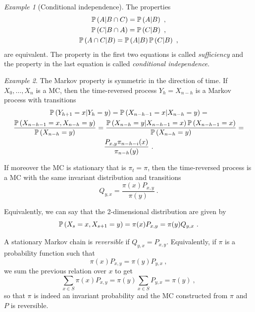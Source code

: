 \documentclass[12pt,a4paper]{amsart}
\theoremstyle{plain}%
\theoremstyle{definition}
\theoremstyle{remark}
\newtheorem{example}{Example}
\begin{document}
\begin{example}[Conditional independence]
The properties
\begin{gather*}
  \operatorname{\mathbb P}\left(A \middle| B \cap C\right) = \operatorname{\mathbb P}\left(A \middle| B\right) \ , \\
  \operatorname{\mathbb P}\left(C \middle| B \cap A\right) = \operatorname{\mathbb P}\left(C \middle| B\right) \ , \\
  \operatorname{\mathbb P}\left(A \cap C \middle| B\right) = \operatorname{\mathbb P}\left(A \middle| B\right) \operatorname{\mathbb P}\left(C \middle| B\right) \ ,
\end{gather*}
are equivalent. The property in the first two equations is called \emph{sufficiency} and the property in the last equation is called \emph{conditional independence}.
\end{example}
\begin{example}
The Markov property is symmetric in the direction of time. If $X_0,\dots,X_n$ is a MC, then the time-reversed process $Y_h = X_{n-h}$ is a Markov process with transitions
\begin{multline*}
  \operatorname{\mathbb P}\left(Y_{h+1}=x \middle| Y_{h}=y\right) = \operatorname{\mathbb P}\left(X_{n-h-1}=x \middle| X_{n-h}=y\right) = \\ \frac{\operatorname{\mathbb P}\left(X_{n-h-1}=x,X_{n-h}=y\right)}{\operatorname{\mathbb P}\left(X_{n-h}=y\right)} = \frac{\operatorname{\mathbb P}\left(X_{n-h}=y \middle| X_{n-h-1}=x\right)\operatorname{\mathbb P}\left(X_{n-h-1}=x\right)}{\operatorname{\mathbb P}\left(X_{n-h}=y\right)} = \\ \frac{P_{x,y}\pi_{n-h-i}(x)}{\pi_{n-h}(y)} \ .
\end{multline*}

If moreover the MC is stationary that is $\pi_t=\pi$, then the time-reversed process is a MC with the same invariant distribution and transitions
\begin{equation*}
  Q_{y,x} = \frac{ \pi(x) P_{x,y}}{\pi(y)} \ .
\end{equation*}

Equivalently, we can say that the 2-dimensional distribution are given by 
\begin{equation*}
  \operatorname{\mathbb P}\left(X_s=x,X_{s+1}=y\right) = \pi(x)P_{x,y} = \pi(y)Q_{y,x} \ .
\end{equation*}

A stationary Markov chain is \emph{reversible} if $Q_{y,x} = P_{x,y}$. Equivalently, if $\pi$ is a probability function such that
\begin{equation*}
 \pi(x)P_{x,y} = \pi(y)P_{y,x} \ , 
\end{equation*}
we sum the previous relation over $x$ to get
\begin{equation*}
  \sum_{x \in S} \pi(x)P_{x,y} = \pi(y) \sum_{x\in S} P_{y,x} = \pi(y) \ ,
\end{equation*}
so that $\pi$ is indeed an invariant probability and the MC constructed from $\pi$ and $P$ is reversible.
\end{example}
\end{document}
